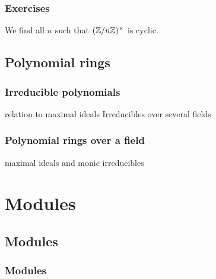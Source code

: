 \documentclass{../../large}
\begin{document}
\section*{Exercises}
\begin{prb}
We find all $n$ such that $(\mathbb{Z}/n\mathbb{Z})^\times$ is cyclic.
\end{prb}





\chapter{Polynomial rings}
\section{Irreducible polynomials}
relation to maximal ideals
Irreducibles over several fields
\begin{prb}
\end{prb}
\begin{prb}
\end{prb}

\section{Polynomial rings over a field}
\begin{prb}
\end{prb}
\begin{prb}
\end{prb}
\begin{prb}
\end{prb}

maximal ideals and monic irreducibles






\part{Modules}



\chapter{Modules}
\section{Modules}
\end{document}
